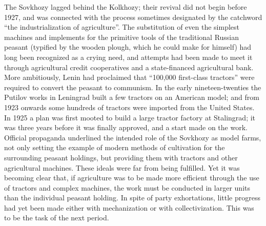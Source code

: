 The Sovkhozy lagged behind the Kolkhozy; their revival did not begin before 1927, and was connected with the process sometimes designated by the catchword ``the industrialization of agriculture''. The substitution of even the simplest machines and implements for the primitive tools of the traditional Russian peasant (typified by the wooden plough, which he could make for himself) had long been recognized as a crying need, and attempts had been made to meet it through agricultural credit cooperatives and a state-financed agricultural bank. More ambitiously, Lenin had proclaimed that ``100,000 first-class tractors'' were required to convert the peasant to communism. In the early nineteen-twenties the Putilov works in Leningrad built a few tractors on an American model; and from 1923 onwards some hundreds of tractors were imported from the United States. In 1925 a plan was first mooted to build a large tractor factory at Stalingrad; it was three years before it was finally approved, and a start made on the work. Official propaganda underlined the intended role of the Sovkhozy as model farms, not only setting the example of modern methods of cultivation for the surrounding peasant holdings, but providing them with tractors and other agricultural machines. These ideals were far from being fulfilled. Yet it was becoming clear that, if agriculture was to be made more efficient through the use of tractors and complex machines, the work must be conducted in larger units than the individual peasant holding. In spite of party exhortations, little progress had yet been made either with mechanization or with collectivization. This was to be the task of the next period.

